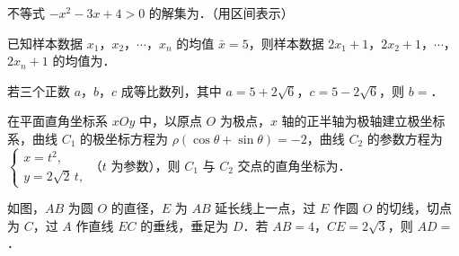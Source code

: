 \begin{question}
不等式 \(-x^2-3x+4>0\) 的解集为\gkblank{}．（用区间表示）

\end{question}
\begin{question}
已知样本数据 \(x_1\)，\(x_2\)，\(\cdots\)，\(x_n\) 的均值 \(\bar{x}=5\)，则样本数据 \(2x_1+1\)，\(2x_2+1\)，\(\cdots\)，\(2x_n+1\) 的均值为\gkblank{}．

\end{question}
\begin{question}
若三个正数 \(a\)，\(b\)，\(c\) 成等比数列，其中 \(a=5+2\sqrt{6}\)，\(c=5-2\sqrt{6}\)，则 \(b=\)\gkblank{}．

\end{question}
\begin{question}
在平面直角坐标系 \(xOy\) 中，以原点 \(O\) 为极点，\(x\) 轴的正半轴为极轴建立极坐标系，曲线 \(C_1\) 的极坐标方程为 \(\rho(\cos\theta+\sin\theta)=-2\)，曲线 \(C_2\) 的参数方程为 \(\begin{cases}x=t^2,\\ y=2\sqrt{2}\,t,\end{cases}\)（\(t\) 为参数），则 \(C_1\) 与 \(C_2\) 交点的直角坐标为\gkblank{}．

\Needspace{0.4\textheight}
\end{question}
\begin{question}
如图，\(AB\) 为圆 \(O\) 的直径，\(E\) 为 \(AB\) 延长线上一点，过 \(E\) 作圆 \(O\) 的切线，切点为 \(C\)，过 \(A\) 作直线 \(EC\) 的垂线，垂足为 \(D\)．若 \(AB=4\)，\(CE=2\sqrt{3}\)，则 \(AD=\)\gkblank{}．
\nopagebreak[4]
\begin{center}\end{center}
\nopagebreak[4]
\end{question}

